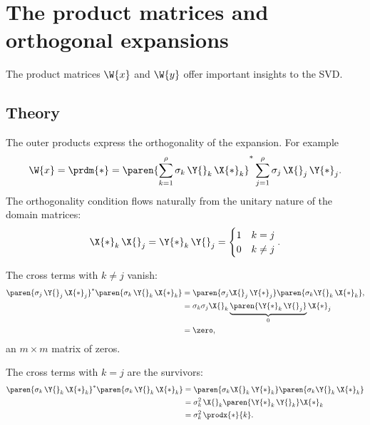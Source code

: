 \section{The product matrices and orthogonal expansions}

The product matrices $\W{x}$ and $\W{y}$ offer important insights to the SVD.

\subsection{Theory}
The outer products express the orthogonality of the expansion. For example
\begin{equation}
  \begin{split}
    \W{x} = \prdm{*} = \paren{\sum_{k=1}^{\rho}{\sigma_{k}\, \Y{}_{k}\, \X{*}_{k}}}^{*}\sum_{j=1}^{\rho}{\sigma_{j}\, \X{}_{j}\, \Y{*}_{j}}.
  \end{split}
\end{equation}
The orthogonality condition flows naturally from the unitary nature of the domain matrices:
\begin{equation}
  \X{*}_{k}\,\X{}_{j} = \Y{*}_{k}\,\Y{}_{j} =
  \begin{cases}
    1 & k = j\\
    0 & k \ne j
  \end{cases}.
\end{equation}

The cross terms with $k\ne j$ vanish:
\begin{equation}
  \begin{split}
    \paren{\sigma_{j}\, \Y{}_{j}\, \X{*}_{j}}^{*}\paren{\sigma_{k}\, \Y{}_{k}\, \X{*}_{k}} &= \paren{\sigma_{j}\X{}_{j}\, \Y{*}_{j}}\paren{\sigma_{k}\Y{}_{k}\, \X{*}_{k}}, \\
    &= \sigma_{k}\sigma_{j}\X{}_{k}\underbrace{\paren{\Y{*}_{k}\,\Y{}_{j}}}_{0}\X{*}_{j}\\
    & = \zero,
  \end{split}
\end{equation}
an $m\times m$ matrix of zeros.

The cross terms with $k=j$ are the survivors:
\begin{equation}
  \begin{split}
    \paren{\sigma_{k}\, \Y{}_{k}\, \X{*}_{k}}^{*}\paren{\sigma_{k}\, \Y{}_{k}\, \X{*}_{k}}&= \paren{\sigma_{k}\X{}_{k}\, \Y{*}_{k}}\paren{\sigma_{k}\Y{}_{k}\, \X{*}_{k}} \\
    &= \sigma_{k}^{2}\,\X{}_{k}\paren{\Y{*}_{k}\,\Y{}_{k}}\X{*}_{k}\\
    &= \sigma_{k}^{2}\,\prodx{*}{k}.
  \end{split}
\end{equation}

